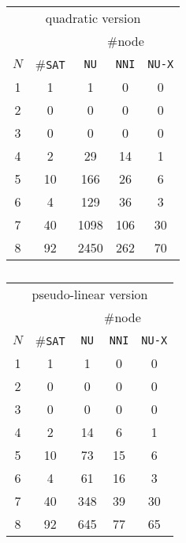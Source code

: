\documentclass[a4paper,10pt]{article}
\begin{document}
\begin{table}
\center
\begin{tabular}{|c | c | c | c | c |}
\multicolumn{5}{|c|}{quadratic version} \\
& & \multicolumn{3}{|c|}{\#node} \\
$N$ & \#\texttt{SAT} & \texttt{NU} & \texttt{NNI} & \texttt{NU-X} \\ \hline
1   & 1              & 1           & 0            & 0             \\
2   & 0              & 0           & 0            & 0             \\
3   & 0              & 0           & 0            & 0             \\
4   & 2              & 29          & 14           & 1             \\
5   & 10             & 166         & 26           & 6             \\
6   & 4              & 129         & 36           & 3             \\
7   & 40             & 1098        & 106          & 30            \\
8   & 92             & 2450        & 262          & 70            \\
\end{tabular}
\begin{tabular}{|c | c | c | c | c |}
\multicolumn{5}{|c|}{pseudo-linear version} \\
& & \multicolumn{3}{|c|}{\#node} \\
$N$ & \#\texttt{SAT} & \texttt{NU} & \texttt{NNI} & \texttt{NU-X} \\ \hline
1   & 1              & 1           & 0            & 0             \\
2   & 0              & 0           & 0            & 0             \\
3   & 0              & 0           & 0            & 0             \\
4   & 2              & 14          & 6            & 1             \\
5   & 10             & 73          & 15           & 6             \\
6   & 4              & 61          & 16           & 3             \\
7   & 40             & 348         & 39           & 30            \\
8   & 92             & 645         & 77           & 65            \\
\end{tabular}
\caption{}
\label{table-nqueens}
\end{table}
\end{document}
